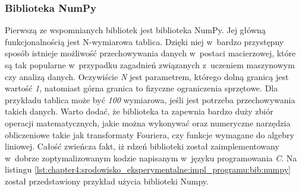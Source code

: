 \documentclass[../Kamil_Kowalewski_Main.tex]{subfiles}
\begin{document}
{{{            \subsubsection{Biblioteka NumPy}
            \label{chapter4:srodowisko_eksperymentalne:impl_programu:bib:numpy} {
                Pierwszą ze wspomnianych bibliotek jest biblioteka NumPy. Jej główną
                funkcjonalnością jest N-wymiarowa tablica. Dzięki niej w~bardzo
                przystępny sposób istnieje możliwość przechowywania danych w~postaci
                macierzowej, które są tak popularne w~przypadku zagadnień związanych
                z~uczeniem maszynowym czy analizą danych. Oczywiście \textit{N} jest
                parametrem, którego dolną granicą jest wartość \textit{1}, natomiast
                górna granica to fizyczne ograniczenia sprzętowe. Dla przykładu tablica
                może być \textit{100} wymiarowa, jeśli jest potrzeba przechowywania
                takich danych. Warto dodać, że biblioteka ta zapewnia bardzo duży zbiór
                operacji matematycznych, jakie można wykonywać oraz numeryczne narzędzia
                obliczeniowe takie jak transformaty Fouriera, czy funkcje wymagane do
                algebry liniowej. Całość zwieńcza fakt, iż rdzeń biblioteki został
                zaimplementowany w~dobrze zoptymalizowanym kodzie napisanym w~języku
                programowania \textit{C}. Na listingu
                \ref{lst:chapter4:srodowisko_eksperymentalne:impl_programu:bib:numpy}
                został przedstawiony przykład użycia biblioteki Numpy.

            }

}}}
\end{document}
